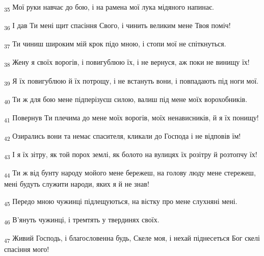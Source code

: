 \begin{tcolorbox}
\textsubscript{35} Мої руки навчає до бою, і на рамена мої лука мідяного напинає.
\end{tcolorbox}
\begin{tcolorbox}
\textsubscript{36} І дав Ти мені щит спасіння Свого, і чинить великим мене Твоя поміч!
\end{tcolorbox}
\begin{tcolorbox}
\textsubscript{37} Ти чиниш широким мій крок підо мною, і стопи мої не спіткнуться.
\end{tcolorbox}
\begin{tcolorbox}
\textsubscript{38} Жену я своїх ворогів, і повигублюю їх, і не вернуся, аж поки не винищу їх!
\end{tcolorbox}
\begin{tcolorbox}
\textsubscript{39} Я їх повигублюю й їх потрощу, і не встануть вони, і повпадають під ноги мої.
\end{tcolorbox}
\begin{tcolorbox}
\textsubscript{40} Ти ж для бою мене підперізуєш силою, валиш під мене моїх ворохобників.
\end{tcolorbox}
\begin{tcolorbox}
\textsubscript{41} Повернув Ти плечима до мене моїх ворогів, моїх ненависників, й я їх понищу!
\end{tcolorbox}
\begin{tcolorbox}
\textsubscript{42} Озирались вони та немає спасителя, кликали до Господа і не відповів їм!
\end{tcolorbox}
\begin{tcolorbox}
\textsubscript{43} І я їх зітру, як той порох землі, як болото на вулицях їх розітру й розтопчу їх!
\end{tcolorbox}
\begin{tcolorbox}
\textsubscript{44} Ти ж від бунту народу мойого мене бережеш, на голову люду мене стережеш, мені будуть служити народи, яких я й не знав!
\end{tcolorbox}
\begin{tcolorbox}
\textsubscript{45} Передо мною чужинці підлещуються, на вістку про мене слухняні мені.
\end{tcolorbox}
\begin{tcolorbox}
\textsubscript{46} В'януть чужинці, і тремтять у твердинях своїх.
\end{tcolorbox}
\begin{tcolorbox}
\textsubscript{47} Живий Господь, і благословенна будь, Скеле моя, і нехай піднесеться Бог скелі спасіння мого!
\end{tcolorbox}
